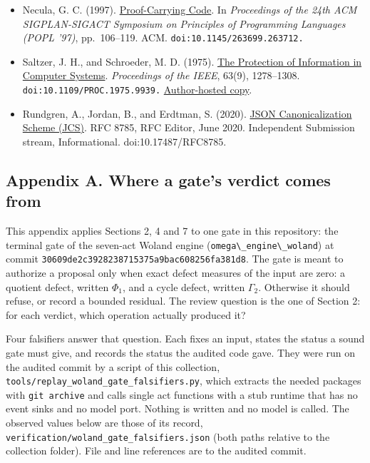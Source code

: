 \documentclass[
  11pt,
]{article}
\newcommand{\passthrough}[1]{#1}
\providecommand{\tightlist}{%
  \setlength{\itemsep}{0pt}\setlength{\parskip}{0pt}}
\begin{document}
\begin{itemize}
\tightlist
\item
  Necula, G. C. (1997).
  \href{https://doi.org/10.1145/263699.263712}{Proof-Carrying Code}. In
  \emph{Proceedings of the 24th ACM SIGPLAN-SIGACT Symposium on
  Principles of Programming Languages (POPL '97)}, pp.~106--119. ACM.
  \nolinkurl{doi:10.1145/263699.263712.}
\item
  Saltzer, J. H., and Schroeder, M. D. (1975).
  \href{https://doi.org/10.1109/PROC.1975.9939}{The Protection of
  Information in Computer Systems}. \emph{Proceedings of the IEEE},
  63(9), 1278--1308. \nolinkurl{doi:10.1109/PROC.1975.9939.}
  \href{https://web.mit.edu/Saltzer/www/publications/protection/}{Author-hosted
  copy}.
\item
  Rundgren, A., Jordan, B., and Erdtman, S. (2020).
  \href{https://www.rfc-editor.org/rfc/rfc8785}{JSON Canonicalization
  Scheme (JCS)}. RFC 8785, RFC Editor, June 2020. Independent Submission
  stream, Informational. doi:10.17487/RFC8785.
\end{itemize}

\subsection{Appendix A. Where a gate's verdict comes
from}\label{appendix-a.-where-a-gates-verdict-comes-from}

This appendix applies Sections 2, 4 and 7 to one gate in this
repository: the terminal gate of the seven-act Woland engine
(\passthrough{\lstinline!omega\_engine\_woland!}) at commit
\nolinkurl{30609de2c3928238715375a9bac608256fa381d8}. The gate is meant
to authorize a proposal only when exact defect measures of the input are
zero: a quotient defect, written \(\Phi_1\), and a cycle defect, written
\(\Gamma_2\). Otherwise it should refuse, or record a bounded residual.
The review question is the one of Section 2: for each verdict, which
operation actually produced it?

Four falsifiers answer that question. Each fixes an input, states the
status a sound gate must give, and records the status the audited code
gave. They were run on the audited commit by a script of this
collection, \nolinkurl{tools/replay_woland_gate_falsifiers.py}, which
extracts the needed packages with \passthrough{\lstinline!git archive!}
and calls single act functions with a stub runtime that has no event
sinks and no model port. Nothing is written and no model is called. The
observed values below are those of its record,
\nolinkurl{verification/woland_gate_falsifiers.json} (both paths
relative to the collection folder). File and line references are to the
audited commit.
\end{document}
